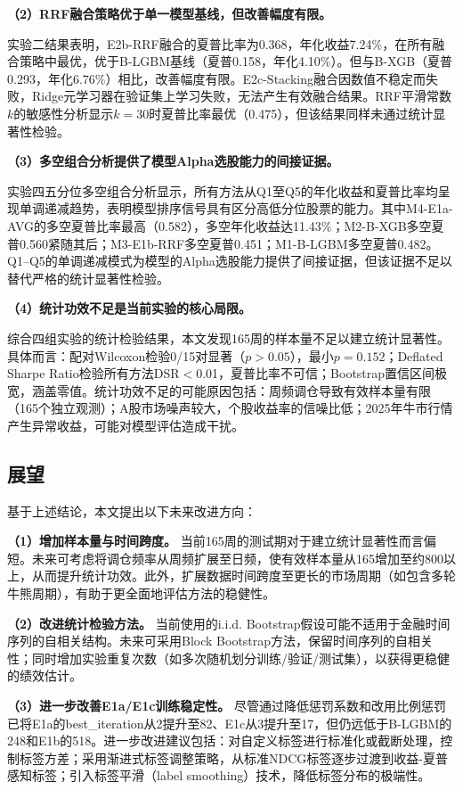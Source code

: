 \documentclass[11pt,a4paper]{ctexart}
\begin{document}
\textbf{（2）RRF融合策略优于单一模型基线，但改善幅度有限。}

实验二结果表明，E2b-RRF融合的夏普比率为0.368，年化收益7.24\%，在所有融合策略中最优，优于B-LGBM基线（夏普0.158，年化4.10\%）。但与B-XGB（夏普0.293，年化6.76\%）相比，改善幅度有限。E2c-Stacking融合因数值不稳定而失败，Ridge元学习器在验证集上学习失败，无法产生有效融合结果。RRF平滑常数$k$的敏感性分析显示$k=30$时夏普比率最优（0.475），但该结果同样未通过统计显著性检验。

\textbf{（3）多空组合分析提供了模型Alpha选股能力的间接证据。}

实验四五分位多空组合分析显示，所有方法从Q1至Q5的年化收益和夏普比率均呈现单调递减趋势，表明模型排序信号具有区分高低分位股票的能力。其中M4-E1a-AVG的多空夏普比率最高（0.582），多空年化收益达11.43\%；M2-B-XGB多空夏普0.560紧随其后；M3-E1b-RRF多空夏普0.451；M1-B-LGBM多空夏普0.482。Q1--Q5的单调递减模式为模型的Alpha选股能力提供了间接证据，但该证据不足以替代严格的统计显著性检验。

\textbf{（4）统计功效不足是当前实验的核心局限。}

综合四组实验的统计检验结果，本文发现165周的样本量不足以建立统计显著性。具体而言：配对Wilcoxon检验0/15对显著（$p>0.05$），最小$p=0.152$；Deflated Sharpe Ratio检验所有方法DSR$<$0.01，夏普比率不可信；Bootstrap置信区间极宽，涵盖零值。统计功效不足的可能原因包括：周频调仓导致有效样本量有限（165个独立观测）；A股市场噪声较大，个股收益率的信噪比低；2025年牛市行情产生异常收益，可能对模型评估造成干扰。

\subsection{展望}

基于上述结论，本文提出以下未来改进方向：

\textbf{（1）增加样本量与时间跨度。} 当前165周的测试期对于建立统计显著性而言偏短。未来可考虑将调仓频率从周频扩展至日频，使有效样本量从165增加至约800以上，从而提升统计功效。此外，扩展数据时间跨度至更长的市场周期（如包含多轮牛熊周期），有助于更全面地评估方法的稳健性。

\textbf{（2）改进统计检验方法。} 当前使用的i.i.d. Bootstrap假设可能不适用于金融时间序列的自相关结构。未来可采用Block Bootstrap方法，保留时间序列的自相关性；同时增加实验重复次数（如多次随机划分训练/验证/测试集），以获得更稳健的绩效估计。

\textbf{（3）进一步改善E1a/E1c训练稳定性。} 尽管通过降低惩罚系数和改用比例惩罚已将E1a的best\_iteration从2提升至82、E1c从3提升至17，但仍远低于B-LGBM的248和E1b的518。进一步改进建议包括：对自定义标签进行标准化或截断处理，控制标签方差；采用渐进式标签调整策略，从标准NDCG标签逐步过渡到收益-夏普感知标签；引入标签平滑（label smoothing）技术，降低标签分布的极端性。
\end{document}
